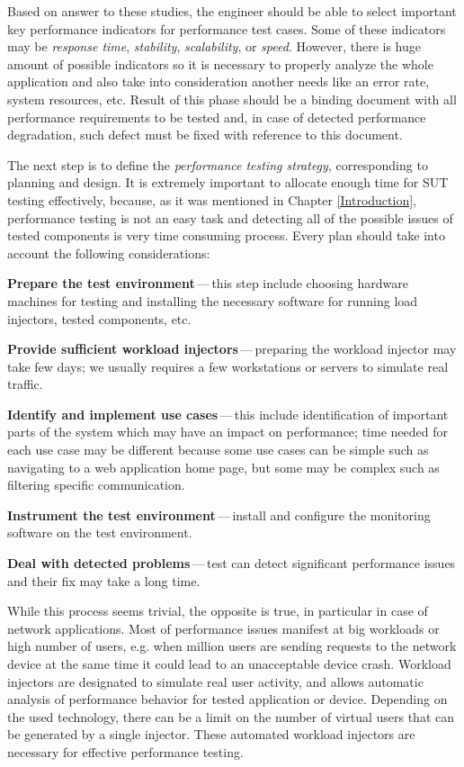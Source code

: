 Based on answer to these studies, the engineer should be able to select important key performance indicators for performance test cases. Some of these indicators may be \emph{response time}, \emph{stability}, \emph{scalability}, or \emph{speed}. However, there is huge amount of possible indicators so it is necessary to properly analyze the whole application and also take into consideration another needs like an error rate, system resources, etc.  Result of this phase should be a binding document with all performance requirements to be tested and, in case of detected performance degradation, such defect must be fixed with reference to this document.

The next step is to define the \emph{performance testing strategy}, corresponding to planning and design. It is extremely important to allocate enough time for SUT testing effectively, because, as it was mentioned in Chapter \ref{Introduction}, performance testing is not an easy task and detecting all of the possible issues of tested components is very time consuming process. Every plan should take into account the following considerations:

\begin{description}
	\setlength\itemsep{0em}
	\item \textbf{Prepare the test environment}\,---\,this step include choosing hardware machines for testing and installing the necessary software for running load injectors, tested components, etc.
	\item \textbf{Provide sufficient workload injectors}\,---\,preparing the workload injector may take few days; we usually requires a few workstations or servers to simulate real traffic.
	\item \textbf{Identify and implement use cases}\,---\,this include identification of important parts of the system which may have an impact on performance; time needed for each use case may be different because some use cases can be simple such as navigating to a web application home page, but some may be complex such as filtering specific communication.
	\item \textbf{Instrument the test environment}\,---\,install and configure the monitoring software on the test environment.
	\item \textbf{Deal with detected problems}\,---\,test can detect significant performance issues and their fix may take a long time.
\end{description}

While this process seems trivial, the opposite is true, in particular in case of network applications. Most of performance issues manifest at big workloads or high number of users, e.g. when million users are sending requests to the network device at the same time it could lead to an unacceptable device crash. Workload injectors are designated to simulate real user activity, and allows automatic analysis of performance behavior for tested application or device. Depending on the used technology, there can be a limit on the number of virtual users that can be generated by a single injector. These automated workload injectors are necessary for effective performance testing.

